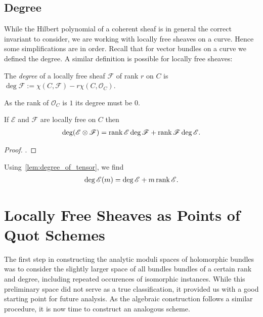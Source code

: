 \documentclass[12pt]{ociamthesis}  %
\begin{document}
\subsection{Degree}

While the Hilbert polynomial of a coherent sheaf is in general the
correct invariant to consider, we are working with locally free
sheaves on a curve. Hence some simplifications are in order.
Recall that for vector bundles on a curve we defined the degree.
A similar definition is possible for locally free sheaves:

\begin{definition}
  The \emph{degree} of a locally free sheaf $\mathscr F$ of rank $r$
  on $C$ is $\deg \mathscr F := \chi (C,\mathscr F) - r\chi(C,\mathscr O_C)$.
\end{definition}

\begin{example}
  As the rank of $\mathscr O_C$ is $1$ its degree must be $0$.
\end{example}

\begin{lemma}\label{lem:degree_of_tensor}
  If $\mathscr E$ and $\mathscr F$ are locally free on $C$ then
  \begin{align*}
    \deg(\mathscr E\otimes\mathscr F) = \operatorname{rank}\mathscr E\deg\mathscr F + \operatorname{rank}\mathscr F\deg\mathscr E.
  \end{align*}
  \begin{proof}
    \cite[Exercise 8.24]{hoskins2016}.
    \missingproof
  \end{proof}
\end{lemma}

\begin{example}
  Using~\ref{lem:degree_of_tensor}, we find 
  \begin{align*}
    \deg \mathscr E(m) = \deg\mathscr E + m\operatorname{rank}\mathscr E.
  \end{align*}
\end{example}

\missingsection

\section{Locally Free Sheaves as Points of Quot Schemes}

The first step in constructing the analytic moduli spaces of
holomorphic bundles was to consider the slightly larger space of
all bundles bundles of a certain rank and degree, including repeated
occurences of isomorphic instances. While this preliminary space
did not serve as a true
classification,
it provided us with a good starting point for future analysis. As the
algebraic construction follows a similar procedure, it is now
time to construct an analogous scheme.
\end{document}
